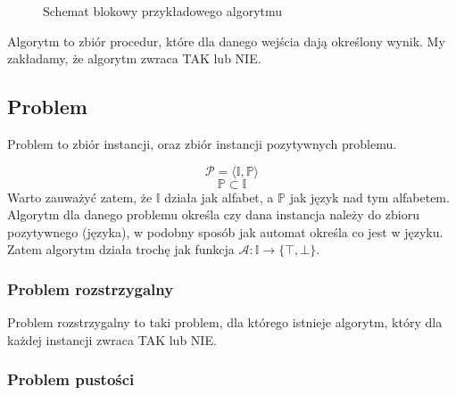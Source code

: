 \documentclass{../notatki}
\begin{document}
\begin{figure}[H]
  \centering
  \caption{Schemat blokowy przykładowego algorytmu}
\end{figure}

Algorytm to zbiór procedur, które dla danego wejścia dają określony
wynik. My zakładamy, że algorytm zwraca TAK lub NIE.

\subsection{Problem}

Problem to zbiór instancji, oraz zbiór instancji pozytywnych problemu.

$$
\mathcal{P} = \langle \mathbb{I}, \mathbb{P} \rangle
$$
$$
\mathbb{P} \subset \mathbb{I}
$$
Warto zauważyć zatem, że $\mathbb{I}$ działa jak alfabet, a
$\mathbb{P}$ jak język nad tym alfabetem.
Algorytm dla danego problemu określa czy dana instancja należy do
zbioru pozytywnego (języka), w podobny sposób jak automat określa co
jest w języku.
Zatem algorytm działa trochę jak funkcja $\mathcal{A}: \mathbb{I}
\rightarrow \{\top, \bot\}$.

\subsubsection{Problem rozstrzygalny}

Problem rozstrzygalny to taki problem, dla którego istnieje algorytm,
który dla każdej instancji zwraca TAK lub NIE.

\subsubsection{Problem pustości}
\end{document}
